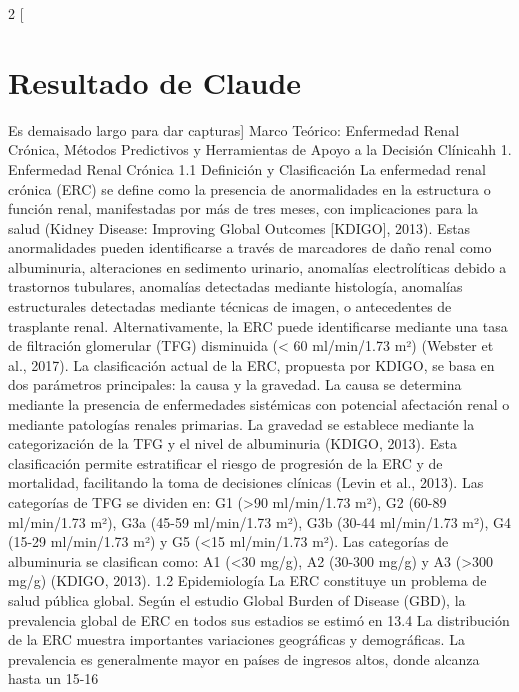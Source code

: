 \documentclass{article}
\begin{document}
\begin{multicols}{2}
    [ \section*{Resultado de Claude}Es demaisado largo
    para dar capturas]
\tiny Marco Teórico: Enfermedad Renal Crónica, Métodos Predictivos y Herramientas de Apoyo a la Decisión Clínicahh
 1. Enfermedad Renal Crónica
 1.1 Definición y Clasificación
La enfermedad renal crónica (ERC) se define como la presencia de anormalidades en la estructura o función renal, manifestadas por más de tres meses, con implicaciones para la salud (Kidney Disease: Improving Global Outcomes [KDIGO], 2013). Estas anormalidades pueden identificarse a través de marcadores de daño renal como albuminuria, alteraciones en sedimento urinario, anomalías electrolíticas debido a trastornos tubulares, anomalías detectadas mediante histología, anomalías estructurales detectadas mediante técnicas de imagen, o antecedentes de trasplante renal. Alternativamente, la ERC puede identificarse mediante una tasa de filtración glomerular (TFG) disminuida (< 60 ml/min/1.73 m²) (Webster et al., 2017).
La clasificación actual de la ERC, propuesta por KDIGO, se basa en dos parámetros principales: la causa y la gravedad. La causa se determina mediante la presencia de enfermedades sistémicas con potencial afectación renal o mediante patologías renales primarias. La gravedad se establece mediante la categorización de la TFG y el nivel de albuminuria (KDIGO, 2013). Esta clasificación permite estratificar el riesgo de progresión de la ERC y de mortalidad, facilitando la toma de decisiones clínicas (Levin et al., 2013).
Las categorías de TFG se dividen en: G1 (>90 ml/min/1.73 m²), G2 (60-89 ml/min/1.73 m²), G3a (45-59 ml/min/1.73 m²), G3b (30-44 ml/min/1.73 m²), G4 (15-29 ml/min/1.73 m²) y G5 (<15 ml/min/1.73 m²). Las categorías de albuminuria se clasifican como: A1 (<30 mg/g), A2 (30-300 mg/g) y A3 (>300 mg/g) (KDIGO, 2013).
 1.2 Epidemiología
La ERC constituye un problema de salud pública global. Según el estudio Global Burden of Disease (GBD), la prevalencia global de ERC en todos sus estadios se estimó en 13.4%
La distribución de la ERC muestra importantes variaciones geográficas y demográficas. La prevalencia es generalmente mayor en países de ingresos altos, donde alcanza hasta un 15-16%

\end{multicols}
\end{document}
